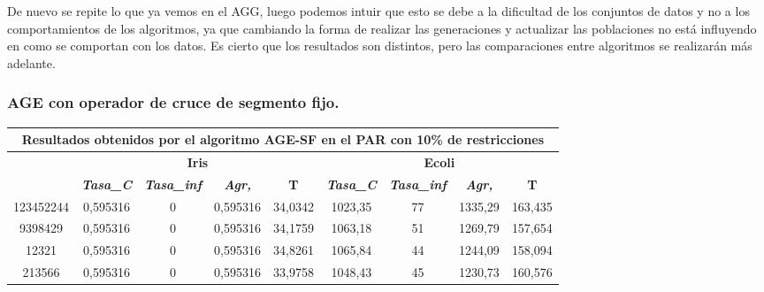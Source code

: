 \documentclass[12pt, spanish]{article}
\begin{document}
De nuevo se repite lo que ya vemos en el AGG, luego podemos intuir que esto se debe a la dificultad de los conjuntos de datos y no a los comportamientos de los algoritmos, ya que cambiando la forma de realizar las generaciones y actualizar las poblaciones no está influyendo en como se comportan con los datos. Es cierto que los resultados son distintos, pero las comparaciones entre algoritmos se realizarán más adelante.

\subsubsection{AGE con operador de cruce de  segmento fijo.}

\begin{table}[H]
\footnotesize
\begin{tabular}{|c|c|c|c|c|c|c|c|c|}
\hline
\multicolumn{9}{|c|}{\textbf{Resultados obtenidos por el algoritmo AGE-SF en el PAR con 10\% de restricciones}}                                                                                                   \\ \hline
\multirow{2}{*}{} & \multicolumn{4}{c|}{\textbf{Iris}}                                                            & \multicolumn{4}{c|}{\textbf{Ecoli}}                                                           \\ \cline{2-9} 
                  & \textit{\textbf{Tasa\_C}} & \textit{\textbf{Tasa\_inf}} & \textit{\textbf{Agr,}} & \textbf{T} & \textit{\textbf{Tasa\_C}} & \textit{\textbf{Tasa\_inf}} & \textit{\textbf{Agr,}} & \textbf{T} \\ \hline
123452244         & 0,595316                  & 0                           & 0,595316               & 34,0342    & 1023,35                   & 77                          & 1335,29                & 163,435    \\ \hline
9398429           & 0,595316                  & 0                           & 0,595316               & 34,1759    & 1063,18                   & 51                          & 1269,79                & 157,654    \\ \hline
12321             & 0,595316                  & 0                           & 0,595316               & 34,8261    & 1065,84                   & 44                          & 1244,09                & 158,094    \\ \hline
213566            & 0,595316                  & 0                           & 0,595316               & 33,9758    & 1048,43                   & 45                          & 1230,73                & 160,576    \\ \hline

\end{tabular}
\end{table}
\end{document}
